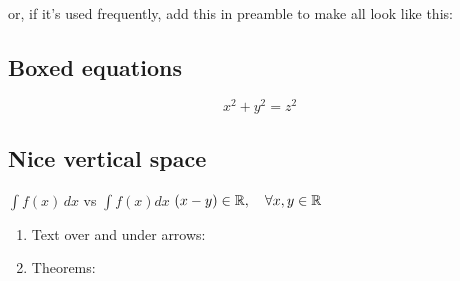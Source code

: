 \\
or, if it's used frequently, add this in preamble to make all look like this:\\
\code{\usepackage[intlimits]{amsmath}}

\subsection*{Boxed equations}

\begin{example}
\begin{equation}
 \boxed{x^2+y^2 = z^2}
\end{equation}
\end{example}

\begin{example}

\end{example}

\subsection*{Nice vertical space}
\begin{example}
\centering
$\int f(x)\,dx$ vs $\int f(x) dx$ 
$(x - y) \in \mathbb{R}, \quad \forall x, y \in \mathbb{R}$
\end{example}

\begin{enumerate}
\item Text over and under arrows:\\
\item Theorems:
\end{enumerate}


